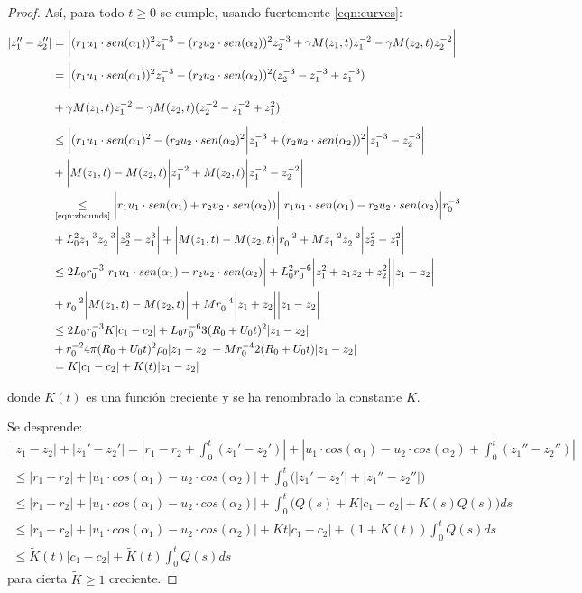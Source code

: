 \documentclass[a4paper,10pt]{scrartcl}
\theoremstyle{definition}
\numberwithin{equation}{section}
\begin{document}
\begin{proof}
 
 Así, para todo $t\ge 0$ se cumple, usando fuertemente \eqref{eqn:curves}:
 \begin{align*}
  |z_1'' - z_2''| &=
  \bigg|(r_1 u_1 \cdot sen(\alpha_1))^2 z_1^{-3} - (r_2 u_2 \cdot sen(\alpha_2))^2 z_2^{-3} + \gamma M(z_1, t) z_1^{-2} - \gamma M(z_2, t) z_2^{-2} \bigg| \\
  &= \bigg|(r_1 u_1 \cdot sen(\alpha_1))^2 z_1^{-3} - (r_2 u_2 \cdot sen(\alpha_2))^2 (z_2^{-3} - z_1^{-3} + z_1^{-3}) \\
  &+ \gamma M(z_1, t) z_1^{-2} - \gamma M(z_2, t) (z_2^{-2} - z_1^{-2} + z_1^{2}) \bigg| \\
  &\le \bigg|(r_1 u_1 \cdot sen(\alpha_1)^2 - (r_2 u_2 \cdot sen(\alpha_2)^2 \bigg| z_1^{-3} + (r_2 u_2 \cdot sen(\alpha_2))^2 \bigg|z_1^{-3} - z_2^{-3}\bigg| \\
  &+ \bigg|M(z_1,t) - M(z_2,t) \bigg|z_1^{-2} + M(z_2, t) \bigg|z_1^{-2} - z_2^{-2}\bigg| \\
  &\underset{\textrm{\eqref{eqn:zbounds}}}{\le} \bigg|r_1 u_1 \cdot sen(\alpha_1)+ r_2 u_2 \cdot sen(\alpha_2))\bigg|\bigg|r_1 u_1 \cdot sen(\alpha_1) - r_2 u_2 \cdot sen(\alpha_2)\bigg| r_0^{-3} \\
  &+ L_0^2 z_1^{-3}z_2^{-3} \bigg|z_2^3 - z_1^3 \bigg| + \bigg|M(z_1,t) - M(z_2,t)\bigg| r_0^{-2} + Mz_1^{-2} z_2^{-2} \bigg|z_2^2 - z_1^2\bigg| \\
  &\underset{\label{eqn:zbounds}}{\le} 2L_0 r_0^{-3}\bigg|r_1 u_1 \cdot sen(\alpha_1) - r_2 u_2 \cdot sen(\alpha_2)\bigg|
  + L_0^{2} r_0^{-6}\bigg|z_1^2 + z_1 z_2 + z_2^2\bigg|\bigg|z_1 - z_2\bigg|\\
  &+ r_0^{-2}\bigg|M(z_1,t) - M(z_2,t)\bigg| + Mr_0^{-4}\bigg|z_1 + z_2\bigg| \bigg|z_1 - z_2\bigg| \\
  &\le 2L_0 r_0^{-3} K|c_1 - c_2| 
  + L_0 r_0^{-6} 3(R_0 + U_0t)^2 |z_1 - z_2| \\
  &+ r_0^{-2} 4\pi (R_0 + U_0t)^2 \rho_0 |z_1 - z_2| + Mr_0^{-4} 2(R_0 + U_0t) |z_1 - z_2|\\
  &= K|c_1 - c_2| + K(t)|z_1 - z_2|
 \end{align*}
 
 donde $K(t)$ es una función creciente y se ha renombrado la constante $K$.
 
 Se desprende:
 \begin{align*}
  |z_1 - z_2| + |z_1' - z_2'| = \left|r_1 - r_2 + \int_0^t (z_1' - z_2')\right| + \left|u_1 \cdot cos(\alpha_1) - u_2 \cdot cos(\alpha_2) + \int_0^t (z_1'' - z_2'') \right|\\
  \le |r_1 - r_2| + |u_1 \cdot cos(\alpha_1) - u_2 \cdot cos(\alpha_2)| + \int_0^t \bigg(|z_1' - z_2'| + |z_1'' - z_2''|\bigg) \\
  \le |r_1 - r_2| + |u_1 \cdot cos(\alpha_1) - u_2 \cdot cos(\alpha_2)| + \int_0^t \bigg(Q(s) + K|c_1 - c_2| + K(s)Q(s)\bigg) ds \\
  \le |r_1 - r_2| + |u_1 \cdot cos(\alpha_1) - u_2 \cdot cos(\alpha_2)| + Kt|c_1 - c_2| + (1 + K(t)) \int_0^t Q(s) ds\\
  \le \widetilde{K}(t)|c_1 - c_2| + \widetilde{K}(t) \int_0^t Q(s) ds
 \end{align*}
 para cierta $\widetilde{K} \ge 1$ creciente. 
 

\end{proof}
\end{document}
